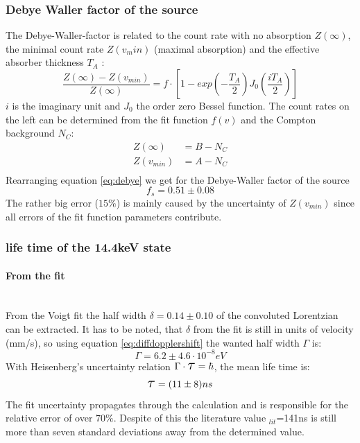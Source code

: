 \subsubsection{Debye Waller factor of the source}
The Debye-Waller-factor is related to the count rate with no absorption $Z(\infty)$, the minimal count rate $Z(v_min)$ (maximal absorption) and the effective absorber thickness $T_A$ \cite{Wegener}:
\begin{equation}
\frac{Z(\infty)-Z(v_{min})}{Z(\infty)}=f\cdot [1-exp(-\frac{T_A}{2})J_0(\frac{iT_A}{2})]
\label{eq:debye}
\end{equation}
$i$ is the imaginary unit and $J_0$ the order zero Bessel function. The count rates on the left can be determined from the fit function $f(v)$ and the Compton background $N_C$:
\begin{equation}
\begin{aligned}
Z(\infty) &= B - N_C\\
Z(v_{min}) &= A-N_C\\
\end{aligned}
\end{equation}
Rearranging equation \ref{eq:debye} we get for the Debye-Waller factor of the source
\begin{equation}
f_s= 0.51\pm0.08
\end{equation}
The rather big error ($15\%$) is mainly caused by the uncertainty of $Z(v_{min})$ since all errors of the fit function parameters contribute.

\subsubsection{life time of the 14.4keV state}
\paragraph{From the fit}\ \\
From the Voigt fit the half width $\delta = 0.14 \pm 0.10$ of the convoluted Lorentzian can be extracted. It has to be noted, that $\delta$ from the fit is still in units of velocity (mm/s), so using equation \ref{eq:diffdopplershift} the wanted half width $\Gamma$ is:
\begin{equation}
\Gamma  = 6.2\pm4.6\cdot 10^{-8} eV
\end{equation}
With Heisenberg's uncertainty relation $\Gamma \cdot \scalebox{1.5}{$\tau$}=\hbar$, the mean life time is:
\begin{equation}
\scalebox{1.5}{$\tau$}= (11\pm8)ns
\end{equation}
The fit uncertainty propagates through the calculation and is responsible for the 
relative error of over $70\%$. Despite of this the literature value \scalebox{1.5}{$\tau$}$_{lit}$=141ns is still more than seven standard deviations away from the determined value.

